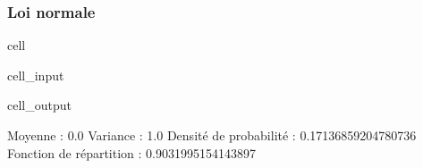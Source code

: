 \documentclass[letterpaper,10pt,english]{jupyterBook}
\begin{document}
\subsubsection{Loi normale}
\label{\detokenize{elemstats:loi-normale}}
\begin{sphinxuseclass}{cell}\begin{sphinxVerbatimInput}

\begin{sphinxuseclass}{cell_input}
\begin{sphinxVerbatim}[commandchars=\\\{\}]
   

   
   
   

        

 
  
       
       
\end{sphinxVerbatim}

\end{sphinxuseclass}\end{sphinxVerbatimInput}
\begin{sphinxVerbatimOutput}

\begin{sphinxuseclass}{cell_output}
\begin{sphinxVerbatim}[commandchars=\\\{\}]
Moyenne :  0.0
Variance :  1.0
Densité de probabilité :  0.17136859204780736
Fonction de répartition :  0.9031995154143897
\end{sphinxVerbatim}

\end{sphinxuseclass}\end{sphinxVerbatimOutput}

\end{sphinxuseclass}
\end{document}
